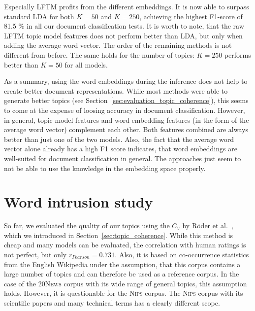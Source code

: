 \documentclass[
        a4paper,
        titlepage,
        twoside,
        parskip,
        numbers=noenddot
        ]{scrbook}
\theoremstyle{break}
\begin{document}
Especially LFTM profits from the different embeddings.
It is now able to surpass standard LDA for both $K = 50$ and $K = 250$, achieving the highest F1-score of 81.5 \% in all our document classification tests.
It is worth to note, that the raw LFTM topic model features does not perform better than LDA, but only when adding the average word vector.
The order of the remaining methods is not different from before.
The same holds for the number of topics: $K = 250$ performs better than $K = 50$ for all models.

As a summary, using the word embeddings during the inference does not help to create better document representations.
While most methods were able to generate better topics (see Section~\ref{sec:evaluation_topic_coherence}), this seems to come at the expense of loosing accuracy in document classification.
However, in general, topic model features and word embedding features (in the form of the average word vector) complement each other.
Both features combined are always better than just one of the two models.
Also, the fact that the average word vector alone already has a high F1 score indicates, that word embeddings are well-suited for document classification in general.
The approaches just seem to not be able to use the knowledge in the embedding space properly.

\section{Word intrusion study}

So far, we evaluated the quality of our topics using the $C_V$ by Röder et al.~\cite{Roder2015}, which we introduced in Section~\ref{sec:topic_coherence}.
While this method is cheap and many models can be evaluated, the correlation with human ratings is not perfect, but only $r_{Pearson} = 0.731$.
Also, it is based on co-occurrence statistics from the English Wikipedia under the assumption, that this corpus contains a large number of topics and can therefore be used as a reference corpus.
In the case of the \textsc{20News} corpus with its wide range of general topics, this assumption holds.
However, it is questionable for the \textsc{Nips} corpus.
The \textsc{Nips} corpus with its scientific papers and many technical terms has a clearly different scope.
\end{document}
